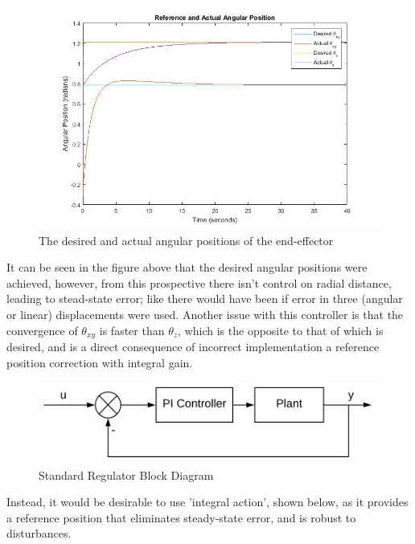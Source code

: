 \documentclass[12pt,openany,a4paper]{book}
\begin{document}
\begin{center}
\begin{figure}[htb]
  \includegraphics[width=1\linewidth]{matlab_inv_des_act_angle.jpg}
\caption{The desired and actual angular positions of the end-effector}
\end{figure}
\end{center}

It can be seen in the figure above that the desired angular positions were achieved, however, from this prospective there isn't control on radial distance, leading to stead-state error; like there would have been if error in three (angular or linear) displacements were used. Another issue with this controller is that the convergence of $\theta_{xy}$ is faster than $\theta_z$, which is the opposite to that of which is desired, and is a direct consequence of incorrect implementation a reference position correction with integral gain.

\begin{center}
\begin{figure}[htb]
  \includegraphics[width=0.8\linewidth]{control_system.jpg}
\caption{Standard Regulator Block Diagram}
\end{figure}
\end{center}

Instead, it would be desirable to use 'integral action', shown below, as it provides a reference position that eliminates steady-state error, and is robust to disturbances.
\end{document}
